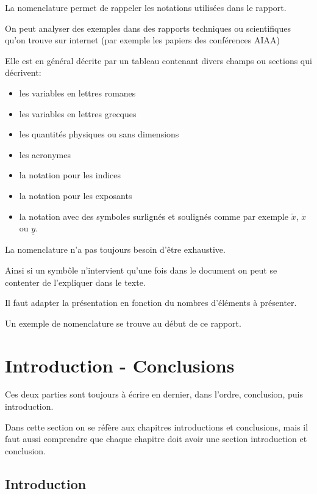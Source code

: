 La nomenclature permet de rappeler les notations utilisées dans le rapport.
 

On peut analyser des exemples dans des rapports techniques ou scientifiques qu'on trouve sur internet (par exemple les papiers des conférences AIAA)


Elle est en général décrite par un tableau contenant divers champs ou sections qui décrivent: 
\begin{itemize}
\item les variables en lettres romanes
\item les variables en lettres grecques
\item les quantités physiques ou sans dimensions
\item les acronymes
\item la notation pour les indices
\item la notation pour les exposants
\item la notation avec des symboles surlignés et soulignés comme par exemple
$\tilde x$, $\dot x$ ou $\underline{y}$.
\end{itemize}

La nomenclature n'a pas toujours besoin d'être exhaustive. 

Ainsi si un symbôle n'intervient qu'une fois dans le document on peut se contenter de 
l'expliquer dans le texte.


Il faut adapter la présentation en fonction du nombres d'éléments à présenter.

Un exemple de nomenclature se trouve au début de ce rapport.


\section{Introduction - Conclusions}

Ces deux parties sont toujours à écrire en dernier, dans l'ordre, conclusion, puis introduction.

Dans cette section on se réfère aux chapitres introductions et conclusions, mais il faut aussi comprendre que chaque chapitre
doit avoir une section introduction et conclusion.

\subsection{Introduction}

